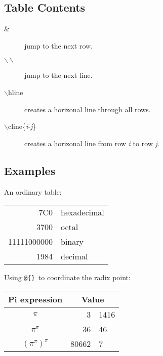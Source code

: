 \subsection{Table Contents}

\begin{description}

\item[\&] jump to the next row.

\item[$\backslash\backslash$] jump to the next line.

\item[$\backslash$hline] creates a horizonal line through all rows.

\item[$\backslash$cline\{\emph{i}-\emph{j}\}] creates a horizonal line from row \emph{i} to row \emph{j}.

\end{description}

\subsection{Examples}

An ordinary table:\\

\begin{tabular}{|r|l|}

\hline
7C0 & hexadecimal \\

3700 & octal \\ \cline{2-2}

11111000000 & binary \\

\hline \hline
1984 & decimal \\

\hline
\end{tabular}

Using \verb|@{}|\ to coordinate the radix point:\\

\begin{tabular}{c r @{.} l}

Pi expression &
\multicolumn{2}{c}{Value} \\

\hline
$\pi$ & 3&1416 \\

$\pi^{\pi}$ & 36&46 \\

$(\pi^{\pi})^{\pi}$ & 80662&7 \\

\end{tabular}

